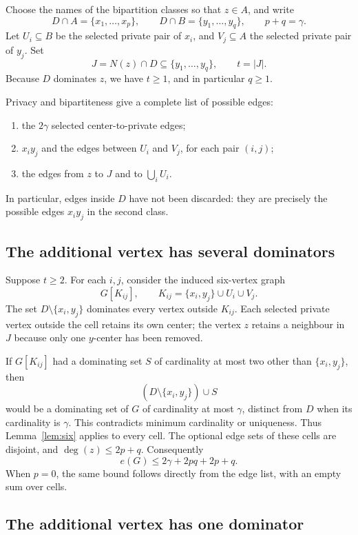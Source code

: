 \documentclass[11pt]{article}
\theoremstyle{definition}
\theoremstyle{remark}
\newcommand{\e}{e}
\begin{document}
Choose the names of the bipartition classes so that $z\in A$, and write
\[
 D\cap A=\{x_1,\ldots,x_p\},\qquad
 D\cap B=\{y_1,\ldots,y_q\},\qquad p+q=\gamma.
\]
Let $U_i\subseteq B$ be the selected private pair of $x_i$, and
$V_j\subseteq A$ the selected private pair of $y_j$. Set
\[
 J=N(z)\cap D\subseteq\{y_1,\ldots,y_q\},\qquad t=|J|.
\]
Because $D$ dominates $z$, we have $t\ge1$, and in particular $q\ge1$.

Privacy and bipartiteness give a complete list of possible edges:
\begin{enumerate}
\item the $2\gamma$ selected center-to-private edges;
\item $x_iy_j$ and the edges between $U_i$ and $V_j$, for each pair $(i,j)$;
\item the edges from $z$ to $J$ and to $\bigcup_iU_i$.
\end{enumerate}
In particular, edges inside $D$ have not been discarded: they are precisely
the possible edges $x_iy_j$ in the second class.

\subsection{The additional vertex has several dominators}

Suppose $t\ge2$. For each $i,j$, consider the induced six-vertex graph
\[
 G[K_{ij}],\qquad K_{ij}=\{x_i,y_j\}\cup U_i\cup V_j.
\]
The set $D\setminus\{x_i,y_j\}$ dominates every vertex outside $K_{ij}$.
Each selected private vertex outside the cell retains its own center;
the vertex $z$ retains a neighbour in $J$ because only one $y$-center has
been removed.

If $G[K_{ij}]$ had a dominating set $S$ of cardinality at most two other
than $\{x_i,y_j\}$, then
\[
 (D\setminus\{x_i,y_j\})\cup S
\]
would be a dominating set of $G$ of cardinality at most $\gamma$, distinct
from $D$ when its cardinality is $\gamma$. This contradicts minimum
cardinality or uniqueness. Thus Lemma~\ref{lem:six} applies to every cell.
The optional edge sets of these cells are disjoint, and
$\deg(z)\le2p+q$. Consequently
\begin{equation}\label{eq:multiple}
 \e(G)\le 2\gamma+2pq+2p+q.
\end{equation}
When $p=0$, the same bound follows directly from the edge list, with an
empty sum over cells.

\subsection{The additional vertex has one dominator}
\end{document}
